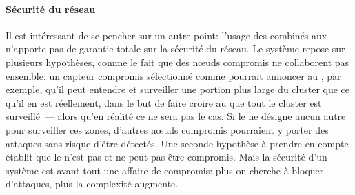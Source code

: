 \paragraph{Sécurité du réseau}
Il est intéressant de se pencher sur un autre point: l'usage des \cns combinés aux \vns n'apporte pas de garantie totale sur la sécurité du réseau.
Le système repose sur plusieurs hypothèses, comme le fait que des nœuds compromis ne collaborent pas ensemble: un capteur compromis sélectionné comme \cn pourrait annoncer au \ch, par exemple, qu'il peut entendre et surveiller une portion plus large du cluster que ce qu'il en est réellement, dans le but de faire croire au \CH que tout le cluster est surveillé~--- alors qu'en réalité ce ne sera pas le cas.
Si le \CH ne désigne aucun autre \cn pour surveiller ces zones, d'autres nœuds compromis pourraient y porter des attaques sans risque d'être détectés.
Une seconde hypothèse à prendre en compte établit que le \ch n'est pas et ne peut pas être compromis. 
Mais la sécurité d'un système est avant tout une affaire de compromis: plus on cherche à bloquer d'attaques, plus la complexité augmente.
